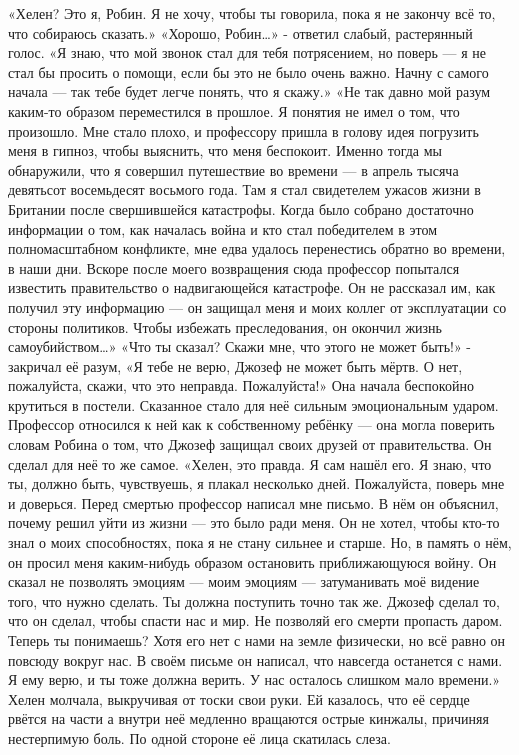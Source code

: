 \documentclass[a4paper,12pt]{book}
\begin{document}
	«Хелен? Это я, Робин. Я не хочу, чтобы ты говорила, пока я не закончу всё то, что собираюсь сказать.»
	«Хорошо, Робин…» - ответил слабый, растерянный голос.
	«Я знаю, что мой звонок стал для тебя потрясением, но поверь — я не стал бы просить о помощи, если бы это не было очень важно. Начну с самого начала — так тебе будет легче понять, что я скажу.»
	«Не так давно мой разум каким-то образом переместился в прошлое. Я понятия не имел о том, что произошло. Мне стало плохо, и профессору пришла в голову идея погрузить меня в гипноз, чтобы выяснить, что меня беспокоит. Именно тогда мы обнаружили, что я совершил путешествие во времени — в апрель тысяча девятьсот восемьдесят восьмого года. Там я стал свидетелем ужасов жизни в Британии после свершившейся катастрофы. Когда было собрано достаточно информации о том, как началась война и кто стал победителем в этом полномасштабном конфликте, мне едва удалось перенестись обратно во времени, в наши дни. Вскоре после моего возвращения сюда профессор попытался известить правительство о надвигающейся катастрофе. Он не рассказал им, как получил эту информацию — он защищал меня и моих коллег от эксплуатации со стороны политиков. Чтобы избежать преследования, он окончил жизнь самоубийством…»
	«Что ты сказал? Скажи мне, что этого не может быть!» - закричал её разум,
	«Я тебе не верю, Джозеф не может быть мёртв. О нет, пожалуйста, скажи, что это неправда. Пожалуйста!»
	Она начала беспокойно крутиться в постели. Сказанное стало для неё сильным эмоциональным ударом. Профессор относился к ней как к собственному ребёнку — она могла поверить словам Робина о том, что Джозеф защищал своих друзей от правительства. Он сделал для неё то же самое.
	«Хелен, это правда. Я сам нашёл его. Я знаю, что ты, должно быть, чувствуешь, я плакал несколько дней. Пожалуйста, поверь мне и доверься. Перед смертью профессор написал мне письмо. В нём он объяснил, почему решил уйти из жизни — это было ради меня. Он не хотел, чтобы кто-то знал о моих способностях, пока я не стану сильнее и старше. Но, в память о нём, он просил меня каким-нибудь образом остановить приближающуюся войну. Он сказал не позволять эмоциям — моим эмоциям — затуманивать моё видение того, что нужно сделать. Ты должна поступить точно так же. Джозеф сделал то, что он сделал, чтобы спасти нас и мир. Не позволяй его смерти пропасть даром. Теперь ты понимаешь? Хотя его нет с нами на земле физически, но всё равно он повсюду вокруг нас. В своём письме он написал, что навсегда останется с нами. Я ему верю, и ты тоже должна верить. У нас осталось слишком мало времени.»
	Хелен молчала, выкручивая от тоски свои руки. Ей казалось, что её сердце рвётся на части а внутри неё медленно вращаются острые кинжалы, причиняя нестерпимую боль. По одной стороне её лица скатилась слеза.
\end{document}

